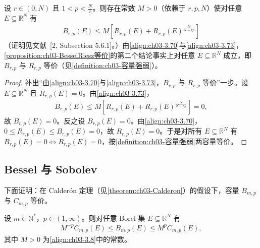 \documentclass[../../main.tex]{subfiles}%
\begin{document}
\begin{remark}\label{remark:ch03-BesselRiesz一般}
设 $r\in(0,N)$ 且 $1<p<\frac Nr$。则存在常数 $M>0$（依赖于 $r,p,N$）使对任意 $E\subseteq\mathbb{R}^N$ 有
\begin{align}
B_{r,p}(E)\leqslant M\left[R_{r,p}(E)+R_{r,p}(E)^{\frac{N}{N-rp}}\right]\label{align:ch03-3.73}
\end{align}
（证明见文献~[2, Subsection 5.6.1]。）由\eqref{align:ch03-3.70}与\eqref{align:ch03-3.73}，\cref{proposition:ch03-BesselRiesz等价}的第二个结论事实上对任意 $E\subseteq\mathbb{R}^N$ 成立，即 $B_{r,p}$ 与 $R_{r,p}$ 等价（见\cref{definition:ch03-容量强弱}）。
\end{remark}

\begin{proof}
补出“由\eqref{align:ch03-3.70}与\eqref{align:ch03-3.73}，$B_{r,p}$ 与 $R_{r,p}$ 等价”一步。设 $E\subseteq\mathbb{R}^N$ 且 $R_{r,p}(E)=0$。由\eqref{align:ch03-3.73}，
\begin{align*}
B_{r,p}(E)\leqslant M\left[R_{r,p}(E)+R_{r,p}(E)^{\frac N{N-rp}}\right]=0,
\end{align*}
故 $B_{r,p}(E)=0$。反之设 $B_{r,p}(E)=0$。由\eqref{align:ch03-3.70}，$0\leqslant R_{r,p}(E)\leqslant B_{r,p}(E)=0$，故 $R_{r,p}(E)=0$。于是对所有 $E\subseteq\mathbb{R}^N$ 有 $B_{r,p}(E)=0\Leftrightarrow R_{r,p}(E)=0$，按\cref{definition:ch03-容量强弱}两容量等价。
\end{proof}

\subsection{Bessel 与 Sobolev}\label{subsection:ch03-BesselSobolev}

下面证明：在 Calderón 定理（见\cref{theorem:ch03-Calderon}）的假设下，容量 $B_{m,p}$ 与 $C_{m,p}$ 等价。

\begin{theorem}\label{theorem:ch03-BesselSobolev等价}\label{theorem:ch03-Sobolev基本}
设 $m\in\mathbb{N}^*$，$p\in(1,\infty)$。则对任意 Borel 集 $E\subseteq\mathbb{R}^N$ 有
\begin{align}
M^{-p}C_{m,p}(E)\leqslant B_{m,p}(E)\leqslant M^pC_{m,p}(E),\label{align:ch03-3.74}
\end{align}
其中 $M>0$ 为\eqref{align:ch03-3.8}中的常数。
\end{theorem}
\end{document}
